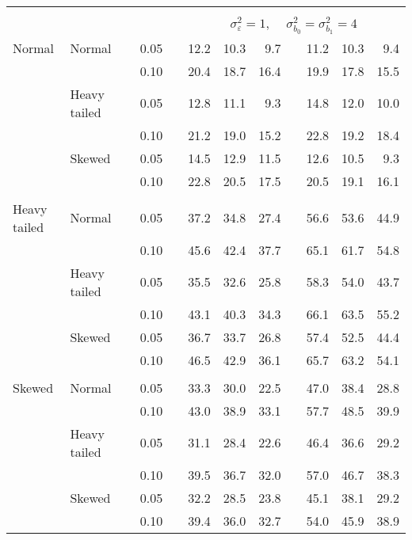 \begin{table}[ht]
\begin{scriptsize}
\begin{tabular}{ll p{.1cm} c p{.1cm} rrr p{.1cm} rrr}
&&&&&&&&&&&\\
& && && \multicolumn{7}{c}{$\sigma_{\varepsilon}^2 = 1$, \ \ $\sigma_{b_0}^2 = \sigma_{b_1}^2 = 4$} \\ \cline{6-12}
\rowcolor{gray!20}  Normal & Normal &  & 0.05 &  & 12.2 & 10.3 & 9.7 &  & 11.2 & 10.3 & 9.4 \\ 
\rowcolor{gray!20}     &  &  & 0.10 &  & 20.4 & 18.7 & 16.4 &  & 19.9 & 17.8 & 15.5 \\ 
\rowcolor{gray!20}     & Heavy tailed &  & 0.05 &  & 12.8 & 11.1 & 9.3 &  & 14.8 & 12.0 & 10.0 \\ 
\rowcolor{gray!20}     &  &  & 0.10 &  & 21.2 & 19.0 & 15.2 &  & 22.8 & 19.2 & 18.4 \\ 
\rowcolor{gray!20}     & Skewed &  & 0.05 &  & 14.5 & 12.9 & 11.5 &  & 12.6 & 10.5 & 9.3 \\ 
\rowcolor{gray!20}     &  &  & 0.10 &  & 22.8 & 20.5 & 17.5 &  & 20.5 & 19.1 & 16.1 \\ 
&&&&&&&&&&&\\
  Heavy tailed & Normal &  & 0.05 &  & 37.2 & 34.8 & 27.4 &  & 56.6 & 53.6 & 44.9 \\ 
   &  &  & 0.10 &  & 45.6 & 42.4 & 37.7 &  & 65.1 & 61.7 & 54.8 \\ 
   & Heavy tailed &  & 0.05 &  & 35.5 & 32.6 & 25.8 &  & 58.3 & 54.0 & 43.7 \\ 
   &  &  & 0.10 &  & 43.1 & 40.3 & 34.3 &  & 66.1 & 63.5 & 55.2 \\ 
   & Skewed &  & 0.05 &  & 36.7 & 33.7 & 26.8 &  & 57.4 & 52.5 & 44.4 \\ 
   &  &  & 0.10 &  & 46.5 & 42.9 & 36.1 &  & 65.7 & 63.2 & 54.1 \\ 
&&&&&&&&&&&\\
  Skewed & Normal &  & 0.05 &  & 33.3 & 30.0 & 22.5 &  & 47.0 & 38.4 & 28.8 \\ 
  &  &  & 0.10 &  & 43.0 & 38.9 & 33.1 &  & 57.7 & 48.5 & 39.9 \\ 
  & Heavy tailed &  & 0.05 &  & 31.1 & 28.4 & 22.6 &  & 46.4 & 36.6 & 29.2 \\ 
  &  &  & 0.10 &  & 39.5 & 36.7 & 32.0 &  & 57.0 & 46.7 & 38.3 \\ 
  & Skewed &  & 0.05 &  & 32.2 & 28.5 & 23.8 &  & 45.1 & 38.1 & 29.2 \\ 
  &  &  & 0.10 &  & 39.4 & 36.0 & 32.7 &  & 54.0 & 45.9 & 38.9 \\ 


\hline
\end{tabular}
\end{scriptsize}
\end{table}



